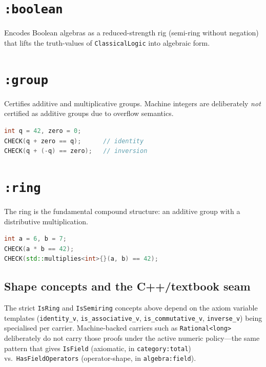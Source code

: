 \documentclass[11pt, a4paper]{report}
\begin{document}
\section{\texttt{:boolean}}
\label{sec:algebra-boolean}

Encodes Boolean algebras as a reduced-strength rig (semi-ring without negation) that lifts the truth-values of \texttt{ClassicalLogic} into algebraic form.

\section{\texttt{:group}}
\label{sec:algebra-group}

Certifies additive and multiplicative groups. Machine integers are deliberately \emph{not} certified as additive groups due to overflow semantics.

\begin{lstlisting}[language=C++, caption={Algebra: group identity and inversion (from \texttt{group\_test.cpp}).}, label={lst:algebra-group}]
int q = 42, zero = 0;
CHECK(q + zero == q);      // identity
CHECK(q + (-q) == zero);   // inversion
\end{lstlisting}

\section{\texttt{:ring}}
\label{sec:algebra-ring}

The ring is the fundamental compound structure: an additive group with a distributive multiplication.

\begin{lstlisting}[language=C++, caption={Algebra: ring multiplication (from \texttt{ring\_test.cpp}).}, label={lst:algebra-ring}]
int a = 6, b = 7;
CHECK(a * b == 42);
CHECK(std::multiplies<int>{}(a, b) == 42);
\end{lstlisting}

\subsection{Shape concepts and the C++/textbook seam}
\label{subsec:algebra-ring-shape-concepts}

The strict \texttt{IsRing} and \texttt{IsSemiring} concepts above depend on the axiom variable templates (\texttt{identity\_v}, \texttt{is\_associative\_v}, \texttt{is\_commutative\_v}, \texttt{inverse\_v}) being specialised per carrier. Machine-backed carriers such as \texttt{Rational<long>} deliberately do not carry those proofs under the active numeric policy---the same pattern that gives \texttt{IsField} (axiomatic, in \texttt{category:total}) vs.\ \texttt{HasFieldOperators} (operator-shape, in \texttt{algebra:field}).
\end{document}
